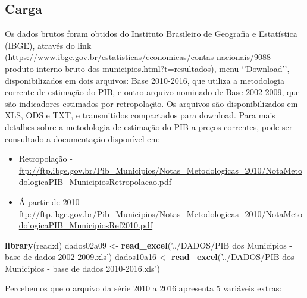 \documentclass[]{article}
\newenvironment{Shaded}{\begin{snugshade}}{\end{snugshade}}
\newcommand{\KeywordTok}[1]{\textcolor[rgb]{0.13,0.29,0.53}{\textbf{#1}}}
\newcommand{\NormalTok}[1]{#1}
\newcommand{\OperatorTok}[1]{\textcolor[rgb]{0.81,0.36,0.00}{\textbf{#1}}}
\newcommand{\StringTok}[1]{\textcolor[rgb]{0.31,0.60,0.02}{#1}}
\begin{document}
\hypertarget{carga}{%
\subsection{Carga}\label{carga}}

Os dados brutos foram obtidos do Instituto Brasileiro de Geografia e
Estatística (IBGE), através do link
(\url{https://www.ibge.gov.br/estatisticas/economicas/contas-nacionais/9088-produto-interno-bruto-dos-municipios.html?t=resultados}),
menu `'Download'', disponibilizados em dois arquivos: Base 2010-2016,
que utiliza a metodologia corrente de estimação do PIB, e outro arquivo
nominado de Base 2002-2009, que são indicadores estimados por
retropolação. Os arquivos são disponibilizados em XLS, ODS e TXT, e
transmitidos compactados para download. Para mais detalhes sobre a
metodologia de estimação do PIB a preços correntes, pode ser consultado
a documentação disponível em:

\begin{itemize}
\item
  Retropolação -
  \url{ftp://ftp.ibge.gov.br/Pib_Municipios/Notas_Metodologicas_2010/NotaMetodologicaPIB_MunicipiosRetropolacao.pdf}
\item
  Á partir de 2010 -
  \url{ftp://ftp.ibge.gov.br/Pib_Municipios/Notas_Metodologicas_2010/NotaMetodologicaPIB_MunicipiosRef2010.pdf}
\end{itemize}

\begin{Shaded}
\begin{Highlighting}[]
\KeywordTok{library}\NormalTok{(readxl)}
\NormalTok{  dados02a09 <-}\StringTok{ }\KeywordTok{read_excel}\NormalTok{(}\StringTok{'../DADOS/PIB dos Municipios - base de dados 2002-2009.xls'}\NormalTok{)}
\NormalTok{  dados10a16 <-}\StringTok{ }\KeywordTok{read_excel}\NormalTok{(}\StringTok{'../DADOS/PIB dos Municipios - base de dados 2010-2016.xls'}\NormalTok{)}
\end{Highlighting}
\end{Shaded}

Percebemos que o arquivo da série 2010 a 2016 apresenta 5 variáveis
extras:

\begin{Shaded}
\end{Shaded}
\end{document}

